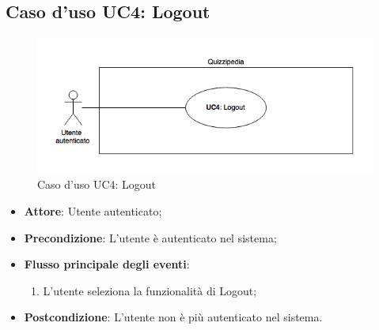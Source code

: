 \documentclass[12pt,a4paper]{article}
\begin{document}
\subsection{Caso d'uso UC4: Logout}
\begin{figure}[H]
	\centering
	\includegraphics[width=\textwidth]{../img/diagramUC4.png}
	\caption{Caso d'uso UC4: Logout}\label{fig:UC4} 
\end{figure}
\begin{itemize}

\item \textbf{Attore}: Utente autenticato; 
\item \textbf{Precondizione}: L'utente è autenticato nel sistema;

\item \textbf{Flusso principale degli eventi}:
\begin{enumerate}
	\item L'utente seleziona la funzionalità di Logout;
	
\end{enumerate}
\item \textbf{Postcondizione}: L'utente non è più autenticato nel sistema.
\end{itemize}
\hypertarget{UC5}{}
\end{document}
